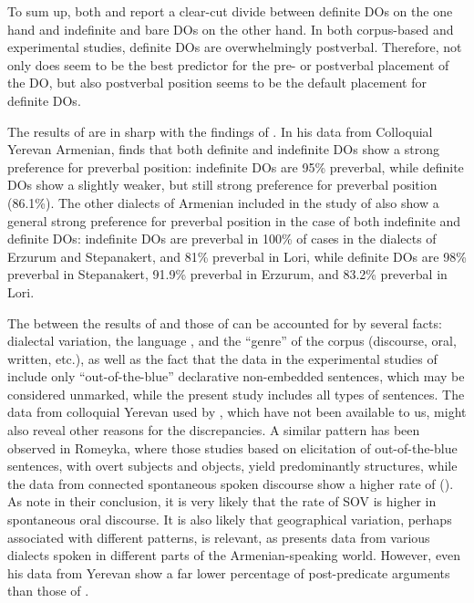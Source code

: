\documentclass[output=paper,colorlinks,citecolor=brown,draftmode]{langscibook}
\begin{document}
To sum up, both \citet{FaghiriSamvelian2020SOV} and \citet{samvelian_persistence_2023} report a clear-cut divide between definite DOs on the one hand and indefinite and bare DOs on the other hand. In both corpus-based and experimental studies, definite DOs are overwhelmingly postverbal. Therefore, not only does  seem to be the best predictor for the pre- or postverbal placement of the DO, but also postverbal position seems to be the default placement for definite DOs.

The results of \citet{samvelian_persistence_2023} are in sharp  with the findings of \citet{stilo_preverbal_2018}. In his data from Colloquial Yerevan Armenian, \citet{stilo_preverbal_2018} finds that both definite and indefinite DOs show a strong preference for preverbal position: indefinite DOs are 95\% preverbal, while definite DOs show a slightly weaker, but still strong preference for preverbal position (86.1\%). The other dialects of Armenian included in the study of \citet{stilo_preverbal_2018} also show a general strong preference for preverbal position in the case of both indefinite and definite DOs: indefinite DOs are preverbal in 100\% of cases in the dialects of Erzurum and Stepanakert, and 81\% preverbal in Lori, while definite DOs are 98\% preverbal in Stepanakert, 91.9\% preverbal in Erzurum, and 83.2\% preverbal in Lori.

The  between the results of \citet{stilo_preverbal_2018} and those of \citet{samvelian_persistence_2023} can be accounted for by several facts: dialectal variation, the language , and the “genre” of the corpus (discourse, oral, written, etc.), as well as the fact that the data in the experimental studies of \citet{samvelian_persistence_2023} include only “out-of-the-blue” declarative non-embedded sentences, which may be considered unmarked, while the present study includes all types of sentences. The data from colloquial Yerevan used by \citet{stilo_preverbal_2018}, which have not been available to us, might also reveal other reasons for the discrepancies. A similar pattern has been observed in Romeyka, where those studies based on elicitation of out-of-the-blue sentences, with overt subjects and objects, yield predominantly  structures, while the data from connected spontaneous spoken discourse show a higher rate of  (). As \citet{samvelian_persistence_2023} note in their conclusion, it is very likely that the rate of SOV is higher in spontaneous oral discourse. It is also likely that geographical variation, perhaps associated with different  patterns, is relevant, as \citet{stilo_preverbal_2018} presents data from various dialects spoken in different parts of the Armenian-speaking world. However, even his data from Yerevan show a far lower percentage of post-predicate arguments than those of \citet{samvelian_persistence_2023}.
\end{document}
